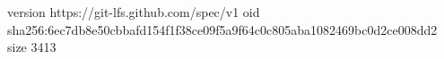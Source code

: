version https://git-lfs.github.com/spec/v1
oid sha256:6ec7db8e50cbbafd154f1f38ce09f5a9f64c0c805aba1082469bc0d2ce008dd2
size 3413
